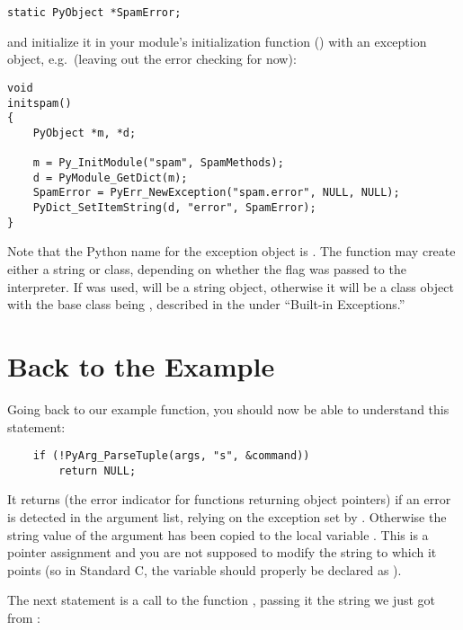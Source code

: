 \documentclass{manual}
\begin{document}
\begin{verbatim}
static PyObject *SpamError;
\end{verbatim}

and initialize it in your module's initialization function
() with an exception object, e.g.\ (leaving out
the error checking for now):

\begin{verbatim}
void
initspam()
{
    PyObject *m, *d;

    m = Py_InitModule("spam", SpamMethods);
    d = PyModule_GetDict(m);
    SpamError = PyErr_NewException("spam.error", NULL, NULL);
    PyDict_SetItemString(d, "error", SpamError);
}
\end{verbatim}

Note that the Python name for the exception object is
.  The  function
may create either a string or class, depending on whether the
 flag was passed to the interpreter.  If
 was used,  will be a string object,
otherwise it will be a class object with the base class being
, described in the
 under ``Built-in
Exceptions.''


\section{Back to the Example
         \label{backToExample}}

Going back to our example function, you should now be able to
understand this statement:

\begin{verbatim}
    if (!PyArg_ParseTuple(args, "s", &command))
        return NULL;
\end{verbatim}

It returns \NULL{} (the error indicator for functions returning
object pointers) if an error is detected in the argument list, relying
on the exception set by .  Otherwise the
string value of the argument has been copied to the local variable
.  This is a pointer assignment and you are not supposed
to modify the string to which it points (so in Standard C, the variable
 should properly be declared as ).

The next statement is a call to the \UNIX{} function
, passing it the string we just got from
:
\end{document}
